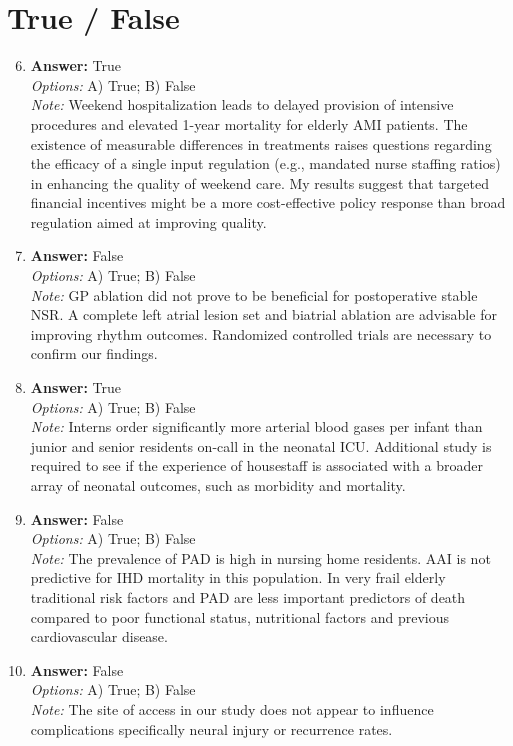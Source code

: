 \documentclass[12pt]{article}
\begin{document}
\section*{True / False}
\begin{enumerate}[label=\arabic*.]
\setcounter{enumi}{5}
\item \textbf{Answer:} True
\\ \textit{Options:} A) True; B) False
\\ \textit{Note:} Weekend hospitalization leads to delayed provision of intensive procedures and elevated 1-year mortality for elderly AMI patients. The existence of measurable differences in treatments raises questions regarding the efficacy of a single input regulation (e.g., mandated nurse staffing ratios) in enhancing the quality of weekend care. My results suggest that targeted financial incentives might be a more cost-effective policy response than broad regulation aimed at improving quality.
\item \textbf{Answer:} False
\\ \textit{Options:} A) True; B) False
\\ \textit{Note:} GP ablation did not prove to be beneficial for postoperative stable NSR. A complete left atrial lesion set and biatrial ablation are advisable for improving rhythm outcomes. Randomized controlled trials are necessary to confirm our findings.
\item \textbf{Answer:} True
\\ \textit{Options:} A) True; B) False
\\ \textit{Note:} Interns order significantly more arterial blood gases per infant than junior and senior residents on-call in the neonatal ICU. Additional study is required to see if the experience of housestaff is associated with a broader array of neonatal outcomes, such as morbidity and mortality.
\item \textbf{Answer:} False
\\ \textit{Options:} A) True; B) False
\\ \textit{Note:} The prevalence of PAD is high in nursing home residents. AAI is not predictive for IHD mortality in this population. In very frail elderly traditional risk factors and PAD are less important predictors of death compared to poor functional status, nutritional factors and previous cardiovascular disease.
\item \textbf{Answer:} False
\\ \textit{Options:} A) True; B) False
\\ \textit{Note:} The site of access in our study does not appear to influence complications specifically neural injury or recurrence rates.
\end{enumerate}
\end{document}
